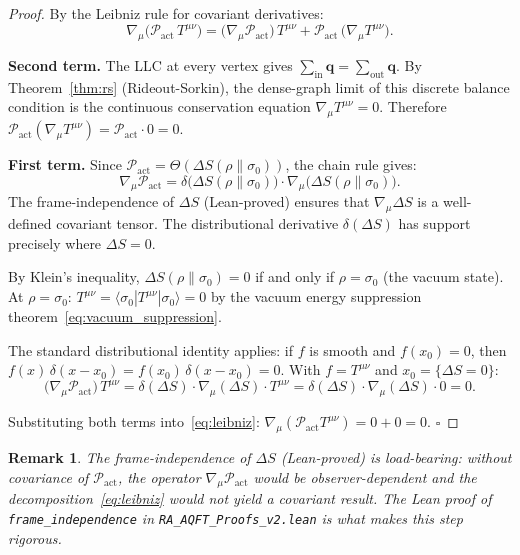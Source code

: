 \documentclass[11pt,a4paper]{article}
\newtheorem{remark}[theorem]{Remark}
\newcommand{\Pact}{\mathcal{P}_{\mathrm{act}}}
\newcommand{\dS}{\Delta S}
\begin{document}
\begin{proof}
By the Leibniz rule for covariant derivatives:
\begin{equation}
  \nabla_\mu\!\bigl(\Pact\,T^{\mu\nu}\bigr)
  = \bigl(\nabla_\mu \Pact\bigr)\,T^{\mu\nu}
    + \Pact\,\bigl(\nabla_\mu T^{\mu\nu}\bigr).
  \label{eq:leibniz}
\end{equation}

\textbf{Second term.}
The LLC at every vertex gives
$\sum_{\mathrm{in}} \mathbf{q} = \sum_{\mathrm{out}} \mathbf{q}$.
By Theorem~\ref{thm:rs} (Rideout-Sorkin), the dense-graph limit of
this discrete balance condition is the continuous conservation equation
$\nabla_\mu T^{\mu\nu} = 0$. Therefore
$\Pact(\nabla_\mu T^{\mu\nu}) = \Pact \cdot 0 = 0$.

\textbf{First term.}
Since $\Pact = \Theta(\dS(\rho\|\sigma_0))$, the chain rule gives:
\begin{equation}
  \nabla_\mu \Pact
  = \delta\!\bigl(\dS(\rho\|\sigma_0)\bigr)
    \cdot \nabla_\mu\!\bigl(\dS(\rho\|\sigma_0)\bigr).
\end{equation}
The frame-independence of $\dS$ (Lean-proved) ensures that
$\nabla_\mu\dS$ is a well-defined covariant tensor. The distributional
derivative $\delta(\dS)$ has support precisely where $\dS = 0$.

By Klein's inequality, $\dS(\rho\|\sigma_0) = 0$ if and only if
$\rho = \sigma_0$ (the vacuum state). At $\rho = \sigma_0$:
$T^{\mu\nu} = \langle\sigma_0|T^{\mu\nu}|\sigma_0\rangle = 0$
by the vacuum energy suppression theorem~\eqref{eq:vacuum_suppression}.

The standard distributional identity applies: if $f$ is smooth and
$f(x_0) = 0$, then $f(x)\,\delta(x - x_0) = f(x_0)\,\delta(x-x_0) = 0$.
With $f = T^{\mu\nu}$ and $x_0 = \{\dS = 0\}$:
\begin{equation}
  \bigl(\nabla_\mu \Pact\bigr)\,T^{\mu\nu}
  = \delta(\dS)\cdot\nabla_\mu(\dS)\cdot T^{\mu\nu}
  = \delta(\dS)\cdot\nabla_\mu(\dS)\cdot 0 = 0.
\end{equation}

Substituting both terms into~\eqref{eq:leibniz}:
$\nabla_\mu(\Pact T^{\mu\nu}) = 0 + 0 = 0$. \hfill$\square$
\end{proof}

\begin{remark}
The frame-independence of $\dS$ (Lean-proved) is load-bearing: without
covariance of $\Pact$, the operator $\nabla_\mu\Pact$ would be
observer-dependent and the decomposition~\eqref{eq:leibniz} would not
yield a covariant result. The Lean proof of \texttt{frame\_independence}
in \texttt{RA\_AQFT\_Proofs\_v2.lean} is what makes this step rigorous.
\end{remark}
\end{document}
